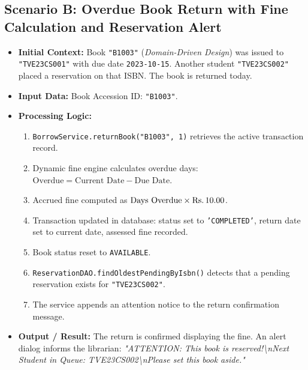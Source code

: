 \subsection{Scenario B: Overdue Book Return with Fine Calculation and Reservation Alert}
\begin{itemize}
    \item \textbf{Initial Context:} Book \texttt{"B1003"} (\textit{Domain-Driven Design}) was issued to \texttt{"TVE23CS001"} with due date \texttt{2023-10-15}. Another student \texttt{"TVE23CS002"} placed a reservation on that ISBN. The book is returned today.
    \item \textbf{Input Data:} Book Accession ID: \texttt{"B1003"}.
    \item \textbf{Processing Logic:}
    \begin{enumerate}
        \item \texttt{BorrowService.returnBook("B1003", 1)} retrieves the active transaction record.
        \item Dynamic fine engine calculates overdue days: $\text{Overdue} = \text{Current Date} - \text{Due Date}$.
        \item Accrued fine computed as $\text{Days Overdue} \times \text{\text{Rs.\,}} 10.00$.
        \item Transaction updated in database: status set to \texttt{'COMPLETED'}, return date set to current date, assessed fine recorded.
        \item Book status reset to \texttt{AVAILABLE}.
        \item \texttt{ReservationDAO.findOldestPendingByIsbn()} detects that a pending reservation exists for \texttt{"TVE23CS002"}.
        \item The service appends an attention notice to the return confirmation message.
    \end{enumerate}
    \item \textbf{Output / Result:} The return is confirmed displaying the fine. An alert dialog informs the librarian: \textit{"ATTENTION: This book is reserved!\textbackslash nNext Student in Queue: TVE23CS002\textbackslash nPlease set this book aside."}
\end{itemize}

